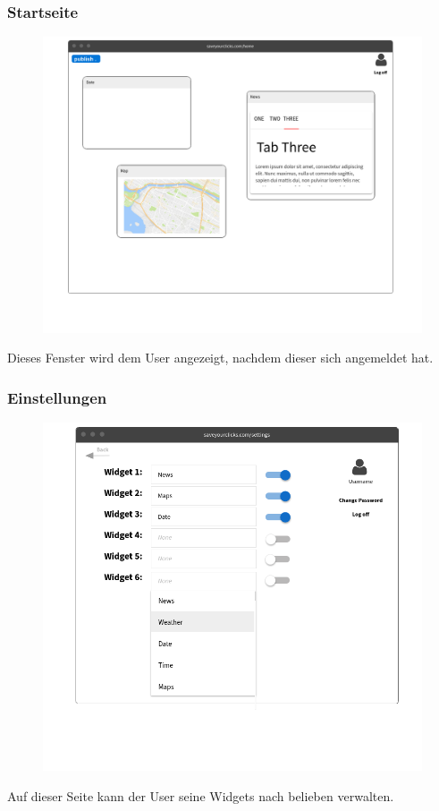 		\subsubsection{Startseite}
			\begin{figure}[H]
				\includegraphics[scale=0.4]{images/p2}
			\end{figure}
			Dieses Fenster wird dem User angezeigt, nachdem dieser sich angemeldet hat.
		
		\subsubsection{Einstellungen}
			\begin{figure}[H]
				\includegraphics[scale=0.5]{images/p3}
			\end{figure}
			Auf dieser Seite kann der User seine Widgets nach belieben verwalten.
		
